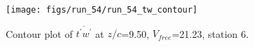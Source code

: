 \begin{figure}[H]
\centering
\texttt{[image: figs/run\_54/run\_54\_tw\_contour]}
\caption{Contour plot of $\overline{t^\prime w^\prime}$ at $z/c$=9.50, $V_{free}$=21.23, station 6.}
\label{fig:run_54_tw_contour}
\end{figure}



